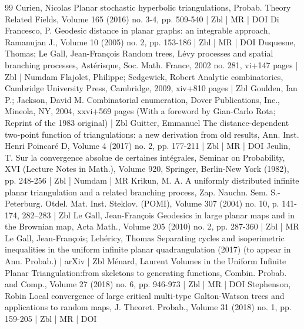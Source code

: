 \documentclass[10pt]{amsart}
\theoremstyle{definition}\newtheorem{defi}[theo]{Definition}\newtheorem{rema}[theo]{Remark}\newtheorem{exam}[theo]{Example}\newtheorem{exem}[theo]{Example}\newtheorem{nota}[theo]{Notation}
\begin{document}
\begin{thebibliography}{99}
Curien, Nicolas Planar stochastic hyperbolic triangulations, Probab. Theory Related Fields, Volume 165 (2016) no. 3-4, pp. 509-540 | Zbl | MR | DOI
Di Francesco, P. Geodesic distance in planar graphs: an integrable approach, Ramanujan J., Volume 10 (2005) no. 2, pp. 153-186 | Zbl | MR | DOI
Duquesne, Thomas; Le Gall, Jean-François Random trees, Lévy processes and spatial branching processes, Astérisque, Soc. Math. France, 2002 no. 281, vi+147 pages | Zbl | Numdam
Flajolet, Philippe; Sedgewick, Robert Analytic combinatorics, Cambridge University Press, Cambridge, 2009, xiv+810 pages | Zbl
Goulden, Ian P.; Jackson, David M. Combinatorial enumeration, Dover Publications, Inc., Mineola, NY, 2004, xxvi+569 pages (With a foreword by Gian-Carlo Rota; Reprint of the 1983 original) | Zbl
Guitter, Emmanuel The distance-dependent two-point function of triangulations: a new derivation from old results, Ann. Inst. Henri Poincaré D, Volume 4 (2017) no. 2, pp. 177-211 | Zbl | MR | DOI
Jeulin, T. Sur la convergence absolue de certaines intégrales, Seminar on Probability, XVI (Lecture Notes in Math.), Volume 920, Springer, Berlin-New York (1982), pp. 248-256 | Zbl | Numdam | MR
Krikun, M. A. A uniformly distributed infinite planar triangulation and a related branching process, Zap. Nauchn. Sem. S.-Peterburg. Otdel. Mat. Inst. Steklov. (POMI), Volume 307 (2004) no. 10, p. 141-174, 282–283 | Zbl
Le Gall, Jean-François Geodesics in large planar maps and in the Brownian map, Acta Math., Volume 205 (2010) no. 2, pp. 287-360 | Zbl | MR
Le Gall, Jean-François; Lehéricy, Thomas Separating cycles and isoperimetric inequalities in the uniform infinite planar quadrangulation (2017) (to appear in Ann. Probab.) | arXiv | Zbl
Ménard, Laurent Volumes in the Uniform Infinite Planar Triangulation:from skeletons to generating functions, Combin. Probab. and Comp., Volume 27 (2018) no. 6, pp. 946-973 | Zbl | MR | DOI
Stephenson, Robin Local convergence of large critical multi-type Galton-Watson trees and applications to random maps, J. Theoret. Probab., Volume 31 (2018) no. 1, pp. 159-205 | Zbl | MR | DOI
\end{thebibliography}
\end{document}
